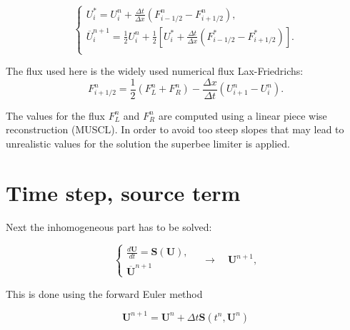 \documentclass[a4paper, oneside]{discothesis}
\begin{document}
\begin{equation}
	\left\{\begin{array}{l}
			U_i^*=U_i^n+\frac{\Delta t}{\Delta x}\left(F_{i-1 / 2}^n-F_{i+1 / 2}^n\right), \\
			\overline{U}_i^{n+1}=\frac{1}{2} U_i^n+\frac{1}{2}\left[U_i^*+\frac{\Delta t}{\Delta x}\left(F_{i-1 / 2}^*-F_{i+1 / 2}^*\right)\right] .  \\
	\end{array} \right.
\end{equation}
\begin{comment}
	\begin{equation}
		U_i^n \underset{\Delta x \rightarrow 0}{=} \frac{1}{\Delta x} \int_{x_i-\frac{\Delta x}{2}}^{x_i+\frac{\Delta x}{2}} q\left(x, t_n\right) d x
	\end{equation}
\end{comment}

The flux used here is the widely used numerical flux Lax-Friedrichs:
\begin{equation}
	F_{i+1 / 2}^n=\frac{1}{2}\left(F_L^n+F_R^n\right)-\frac{\Delta x}{\Delta t}\left(U_{i+1}^n-U_i^n\right) .
\end{equation}

The values for the flux $F_L^n$ and $F_R^n$ are computed using a linear piece wise reconstruction (MUSCL).
In order to avoid too steep slopes that may lead to unrealistic values for the solution the superbee limiter is applied.


\section{Time step, source term}
Next the inhomogeneous part has to be solved:

\begin{equation}
	\left\{\begin{array}{l}
			\frac{d \mathbf{U}}{d t}=\mathbf{S}(\mathbf{U}), \\
			\overline{\mathbf{U}}^{n+1}
	\end{array} \quad \rightarrow \quad \mathbf{U}^{n+1},\right.
\end{equation}

This is done using the forward Euler method

\begin{equation}
	\mathbf{U}^{n+1}=\mathbf{U}^n + \Delta t \mathbf{S}\left(t^n, \mathbf{U}^n\right)
\end{equation}
\end{document}
